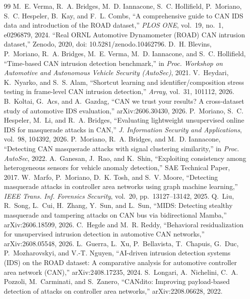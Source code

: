 \documentclass[conference]{IEEEtran}
\begin{document}
\begin{thebibliography}{99}
\footnotesize
{} M.~E. Verma, R.~A. Bridges, M.~D. Iannacone, S.~C. Hollifield, P.~Moriano, S.~C. Hespeler, B.~Kay, and F.~L. Combs, ``A comprehensive guide to CAN IDS data and introduction of the ROAD dataset,'' \emph{PLOS ONE}, vol.~19, no.~1, e0296879, 2024.
 ``Real ORNL Automotive Dynamometer (ROAD) CAN intrusion dataset,'' Zenodo, 2020, doi: 10.5281/zenodo.10462796.
 D.~H. Blevins, P.~Moriano, R.~A. Bridges, M.~E. Verma, M.~D. Iannacone, and S.~C. Hollifield, ``Time-based CAN intrusion detection benchmark,'' in \emph{Proc. Workshop on Automotive and Autonomous Vehicle Security (AutoSec)}, 2021.
 V.~Heydari, K.~Nyarko, and S.~S. Alam, ``Shortcut learning and identifier/composition stress testing in frame-level CAN intrusion detection,'' \emph{Array}, vol.~31, 101112, 2026.
 B.~Koltai, G.~Acs, and A.~Gazdag, ``CAN we trust your results? A cross-dataset study of automotive IDS evaluation,'' arXiv:2606.30430, 2026.
 P.~Moriano, S.~C. Hespeler, M.~Li, and R.~A. Bridges, ``Evaluating lightweight unsupervised online IDS for masquerade attacks in CAN,'' \emph{J. Information Security and Applications}, vol.~98, 104392, 2026.
 P.~Moriano, R.~A. Bridges, and M.~D. Iannacone, ``Detecting CAN masquerade attacks with signal clustering similarity,'' in \emph{Proc. AutoSec}, 2022.
 A.~Ganesan, J.~Rao, and K.~Shin, ``Exploiting consistency among heterogeneous sensors for vehicle anomaly detection,'' SAE Technical Paper, 2017.
 W.~Marfo, P.~Moriano, D.~K. Tosh, and S.~V. Moore, ``Detecting masquerade attacks in controller area networks using graph machine learning,'' \emph{IEEE Trans. Inf. Forensics Security}, vol.~20, pp.~13127--13142, 2025.
 Q.~Liu, R.~Song, L.~Cui, H.~Zhang, Y.~Sun, and L.~Sun, ``MIDS: Detecting stealthy masquerade and tampering attacks on CAN bus via bidirectional Mamba,'' arXiv:2606.18599, 2026.
 C.~Hegde and M.~R. Reddy, ``Behavioral residualization for unsupervised intrusion detection in automotive CAN networks,'' arXiv:2608.05548, 2026.
 L.~Guerra, L.~Xu, P.~Bellavista, T.~Chapuis, G.~Duc, P.~Mozharovskyi, and V.-T. Nguyen, ``AI-driven intrusion detection systems (IDS) on the ROAD dataset: A comparative analysis for automotive controller area network (CAN),'' arXiv:2408.17235, 2024.
 S.~Longari, A.~Nichelini, C.~A. Pozzoli, M.~Carminati, and S.~Zanero, ``CANdito: Improving payload-based detection of attacks on controller area networks,'' arXiv:2208.06628, 2022.

\end{thebibliography}
\end{document}
